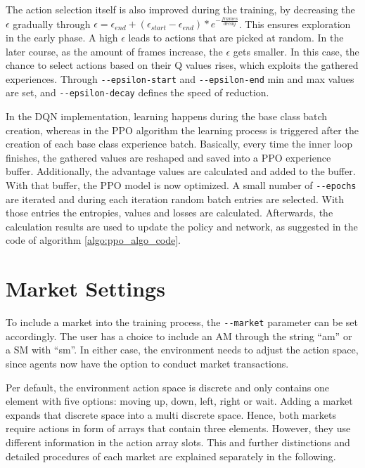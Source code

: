 The action selection itself is also improved during the training, by decreasing the $\epsilon$ gradually through $\epsilon = \epsilon_{end}+(\epsilon_{start}-\epsilon_{end})*e^{-\frac{frames}{decay}}$. This ensures exploration in the early phase. A high $\epsilon$ leads to actions that are picked at random. In the later course, as the amount of frames increase, the $\epsilon$ gets smaller. In this case, the chance to select actions based on their Q values rises, which exploits the gathered experiences. Through \verb|--epsilon-start| and \verb|--epsilon-end| min and max values are set, and \verb|--epsilon-decay| defines the speed of reduction.

In the DQN implementation, learning happens during the base class batch creation, whereas in the PPO algorithm the learning process is triggered after the creation of each base class experience batch. Basically, every time the inner loop finishes, the gathered values are reshaped and saved into a PPO experience buffer. Additionally, the advantage values are calculated and added to the buffer. With that buffer, the PPO model is now optimized. A small number of \verb|--epochs| are iterated and during each iteration random batch entries are selected. With those entries the entropies, values and losses are calculated. Afterwards, the calculation results are used to update the policy and network, as suggested in the code of algorithm \ref{algo:ppo_algo_code}.

\section{Market Settings}\label{market_settings}
To include a market into the training process, the \verb|--market| parameter can be set accordingly. The user has a choice to include an AM through the string ``am'' or a SM with ``sm''. In either case, the environment needs to adjust the action space, since agents now have the option to conduct market transactions.

Per default, the environment action space is discrete and only contains one element with five options: moving up, down, left, right or wait. Adding a market expands that discrete space into a multi discrete space. Hence, both markets require actions in form of arrays that contain three elements. However, they use different information in the action array slots. This and further distinctions and detailed procedures of each market are explained separately in the following.

